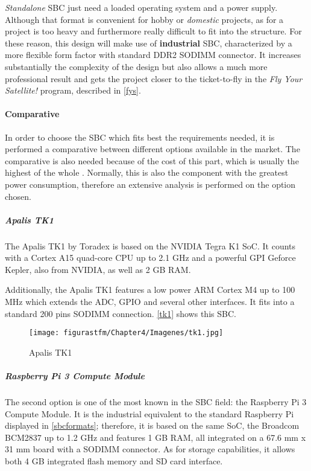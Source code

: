 \textit{Standalone} \acrshort{SBC} just need a loaded operating system and a power supply. Although that format is convenient for hobby or \textit{domestic} projects, as for a  project is too heavy and furthermore really difficult to fit into the structure. For these reason, this design will make use of \textbf{industrial} \acrshort{SBC}, characterized by a more flexible form  factor with standard DDR2 SODIMM connector. It  increases substantially the complexity of the design but also allows a much more professional result and gets the project closer to the ticket-to-fly in the \textit{Fly Your Satellite!} program, described in \ref{fys}.

\paragraph{Comparative}

In order to choose the \acrshort{SBC} which fits best the requirements needed, it is performed a comparative between different options available in the market. The comparative is also needed because of the cost of this part, which is usually the highest of the whole .  Normally, this is also the component with the greatest power consumption, therefore an extensive analysis is performed on the option chosen.

\subparagraph{Apalis TK1}

The Apalis TK1 by Toradex \cite{apalistk1} is based on the NVIDIA Tegra K1 \acrshort{SoC}. It counts with a Cortex A15 quad-core CPU up to 2.1 GHz and a powerful GPI Geforce Kepler, also from NVIDIA, as well as 2 GB RAM.

Additionally, the Apalis TK1 features a low power ARM Cortex M4 up to 100 MHz which extends the \acrshort{ADC}, \acrshort{GPIO} and several other interfaces. It fits into a standard 200 pins SODIMM connection. \autoref{tk1} shows this \acrshort{SBC}.


\begin{figure} [H]
			\centering
			\texttt{[image: figurastfm/Chapter4/Imagenes/tk1.jpg]}
			\caption{Apalis TK1} \label{tk1}
\end{figure}


\subparagraph{Raspberry Pi 3 Compute Module}

The second option is one of the most known in the \acrshort{SBC} field: the Raspberry Pi 3 Compute Module. It is the industrial equivalent to the standard Raspberry Pi displayed in \autoref{sbcformats}; therefore, it is based on the same \acrshort{SoC}, the Broadcom BCM2837 up to 1.2 GHz and features 1 GB RAM, all integrated on a 67.6 mm x 31 mm board with a SODIMM connector. As for storage capabilities, it allows both 4 GB integrated flash memory and \acrshort{SD} card interface.

